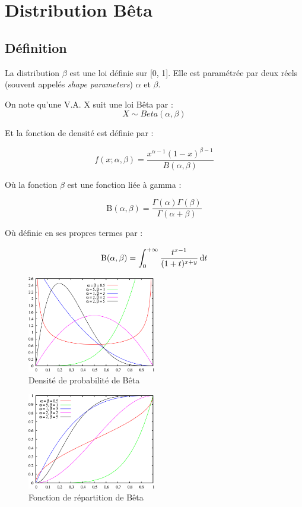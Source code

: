 \documentclass[french]{article}
\numberwithin{equation}{section}
\begin{document}
\section{Distribution Bêta}

\subsection{Définition}

La distribution $\beta$ est une loi définie sur [0, 1]. Elle est paramétrée par deux réels (souvent appelés \textit{shape parameters}) $\alpha$ et $\beta$.

On note qu'une V.A. X suit une loi Bêta par :
\[
X \sim Beta(\alpha, \beta) 
\]

Et la fonction de densité est définie par :

\begin{equation}
f(x; \alpha, \beta) = \frac{x^{\alpha - 1} (1 - x)^{\beta - 1}}{B(\alpha, \beta)}
\end{equation}

Où la fonction $\beta$ est une fonction liée à gamma :

\begin{equation}
\text{B}(\alpha, \beta) = \frac{\Gamma(\alpha)\Gamma(\beta)}{\Gamma(\alpha + \beta)}
\end{equation}

Où définie en ses propres termes par :

\begin{equation}
\text{B}(\alpha, \beta) = \int_{0}^{+\infty} \frac{t^{x-1}}{(1+t)^{x+y}}\operatorname{d \!} t
\end{equation}

\begin{figure}[h]
	\centering
	\includegraphics[width=0.5\textwidth]{Beta_distribution_pdf}
	\caption{Densité de probabilité de Bêta}
\end{figure}

\begin{figure}[h]
	\centering
	\includegraphics[width=0.5\textwidth]{800px-Beta_distribution_cdf}
	\caption{Fonction de répartition de Bêta}
\end{figure}
\end{document}
